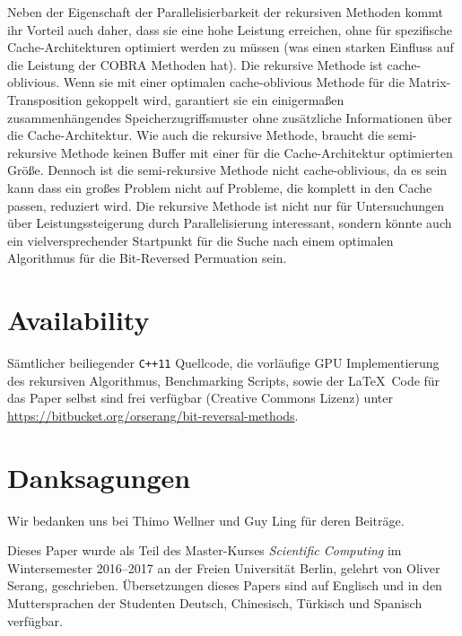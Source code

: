 \documentclass[10pt]{article}
\begin{document}
Neben der Eigenschaft der Parallelisierbarkeit der rekursiven Methoden kommt ihr Vorteil auch daher, dass sie eine hohe Leistung erreichen, ohne 
für spezifische Cache-Architekturen optimiert werden zu müssen (was einen starken Einfluss auf die Leistung der COBRA Methoden hat). 
Die rekursive Methode ist cache-oblivious. Wenn sie mit einer optimalen cache-oblivious Methode für die Matrix-Transposition 
\cite{prokop:cache}gekoppelt wird, garantiert sie ein einigermaßen zusammenhängendes 
Speicherzugriffsmuster ohne zusätzliche Informationen über die Cache-Architektur.
Wie auch die rekursive Methode, braucht die semi-rekursive Methode keinen Buffer mit einer für die Cache-Architektur optimierten Größe.
Dennoch ist die semi-rekursive Methode nicht cache-oblivious, da es sein kann dass ein großes Problem nicht auf Probleme, die komplett in den Cache 
passen, reduziert wird. Die rekursive Methode ist nicht nur für Untersuchungen über Leistungssteigerung durch 
Parallelisierung interessant, sondern könnte auch ein vielversprechender Startpunkt für die Suche nach einem optimalen 
Algorithmus für die Bit-Reversed Permuation sein.

\section*{Availability}
Sämtlicher beiliegender {\tt C++11} Quellcode, die vorläufige GPU Implementierung 
des rekursiven Algorithmus, Benchmarking Scripts, sowie der \LaTeX\ Code für das Paper selbst
sind frei verfügbar (Creative Commons Lizenz) unter 
\url{https://bitbucket.org/orserang/bit-reversal-methods}.\newline

\section*{Danksagungen}

Wir bedanken uns bei Thimo Wellner und Guy Ling für deren Beiträge. \newline

\noindent Dieses Paper wurde als Teil des Master-Kurses {\it Scientific Computing} 
im Wintersemester 2016--2017 an der Freien Universität Berlin, gelehrt von Oliver Serang,
geschrieben. Übersetzungen dieses Papers sind auf Englisch und in den Muttersprachen der Studenten
Deutsch, Chinesisch, Türkisch und Spanisch verfügbar. 
\end{document}
